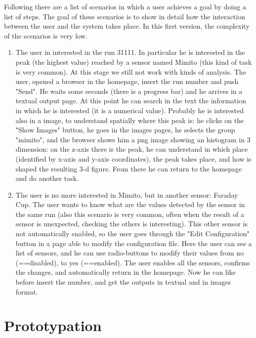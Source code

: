 Following there are a list of scenarios in which a user achieves a goal by doing a list of steps. The goal of these scenarios is to show in detail how the interaction between the user and the system takes place. In this first version, the complexity of the scenarios is very low. 

\begin{enumerate}

\item The user in interested in the run 31111. In particular he is interested in the peak (the highest value) reached by a sensor named Mimito (this kind of task is very common). At this stage we still not work with kinds of analysis. The user, opened a browser in the homepage, insert the run number and push "Send". He waits some seconds (there is a progress bar) and he arrives in a textual output page. At this point he can search in the text the information in which he is interested (it is a numerical value). Probably he is interested also in a image, to understand spatially where this peak is: he clicks on the "Show Images" button, he goes in the images pages, he selects the group "mimito", and the browser shows him a png image showing an histogram in 3 dimension: on the z-axis there is the peak, he can understand in which place (identified by x-axis and y-axis coordinates), the peak takes place, and how is shaped the resulting 3-d figure. From there he can return to the homepage and do another task.   

\item The user is no more interested in Mimito, but in another sensor: Faraday Cup. The user wants to know what are the values detected by the sensor in the same run (also this scenario is very common, often when the result of a sensor is unexpected, checking the others is interesting). This other sensor is not automatically enabled, so the user goes through the "Edit Configuration" button in a page able to modify the configuration file. Here the user can see a list of sensors, and he can use radio-buttons to modify their values from no (==disabled), to yes (==enabled). The user enables all the sensors, confirms the changes, and automatically return in the homepage. Now he can like before insert the number, and get the outputs in textual and in images format.  



\end{enumerate}


\section{Prototypation}

